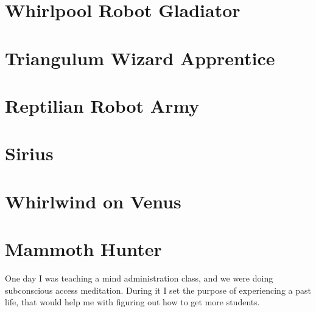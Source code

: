 \chapter{Whirlpool Robot Gladiator}
\chapter{Triangulum Wizard Apprentice}
\chapter{Reptilian Robot Army}
\chapter{Sirius}
% 
% 
% 
% 
% 
\chapter{Whirlwind on Venus}
\chapter{Mammoth Hunter}\label{reincarnation:mammoth}
One day I was teaching a mind administration class, and we were doing 
subconscious access meditation. During it I set the purpose of experiencing a
past life, that would help me with figuring out how to get more students.

